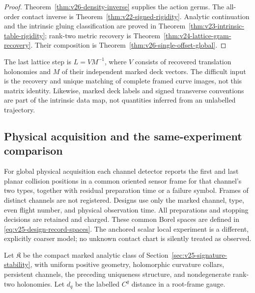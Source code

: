 \begin{proof}
Theorem~\ref{thm:v26-density-inverse} supplies the action germs.  The
all-order contact inverse is Theorem~\ref{thm:v22-signed-rigidity}.
Analytic continuation and the intrinsic gluing classification are proved
in Theorem~\ref{thm:v23-intrinsic-table-rigidity}; rank-two metric recovery
is Theorem~\ref{thm:v24-lattice-gram-recovery}.  Their composition is
Theorem~\ref{thm:v26-single-offset-global}.
\end{proof}

The last lattice step is \(L=VM^{-1}\), where \(V\) consists of recovered
translation holonomies and \(M\) of their independent marked deck
vectors.  The difficult input is the recovery and unique matching of
complete framed curve images, not this matrix identity.  Likewise, marked
deck labels and signed transverse conventions are part of the intrinsic
data map, not quantities inferred from an unlabelled trajectory.

\subsection{Physical acquisition and the same-experiment comparison}

For global physical acquisition each channel detector reports the first and
last planar collision positions in a common oriented sensor frame for that
channel's two types, together with residual preparation time or a failure
symbol.  Frames of distinct channels are not registered.  Designs use only
the marked channel, type, even flight number, and physical observation time.
All preparations and stopping decisions are retained and charged.  These
common Borel spaces are defined in \eqref{eq:v25-design-record-spaces}.
The anchored scalar local experiment is a different, explicitly coarser
model; no unknown contact chart is silently treated as observed.

Let \(\mathfrak K\) be the compact marked analytic class of
Section~\ref{sec:v25-signature-stability}, with uniform positive geometry,
holomorphic curvature collars, persistent channels, the preceding uniqueness
structure, and nondegenerate rank-two holonomies.  Let \(d_q\) be the
labelled \(C^q\) distance in a root-frame gauge.

